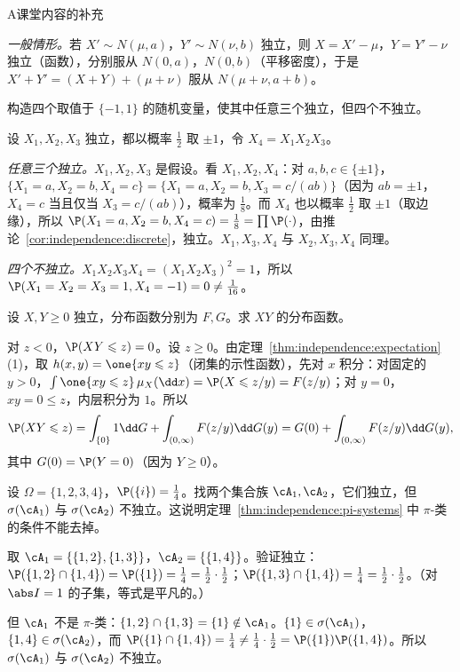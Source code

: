 \begin{exercises}{A}{课堂内容的补充}
\begin{solution}
\emph{一般情形。}若 $X'\sim N(\mu,a)$，$Y'\sim N(\nu,b)$ 独立，则 $X=X'-\mu$，$Y=Y'-\nu$ 独立（函数），分别服从 $N(0,a)$，$N(0,b)$（平移密度），于是 $X'+Y'=(X+Y)+(\mu+\nu)$ 服从 $N(\mu+\nu,a+b)$。
\end{solution}

\item\label{ex:independence:A7} 构造四个取值于 $\{-1,1\}$ 的随机变量，使其中任意三个独立，但四个不独立。
\begin{solution}
设 $X_1,X_2,X_3$ 独立，都以概率 $\frac12$ 取 $\pm1$，令 $X_4=X_1X_2X_3$。

\emph{任意三个独立。}$X_1,X_2,X_3$ 是假设。看 $X_1,X_2,X_4$：对 $a,b,c\in\{\pm1\}$，$\{X_1=a,X_2=b,X_4=c\}=\{X_1=a,X_2=b,X_3=c/(ab)\}$（因为 $ab=\pm1$，$X_4=c$ 当且仅当 $X_3=c/(ab)$），概率为 $\frac18$。而 $X_4$ 也以概率 $\frac12$ 取 $\pm1$（取边缘），所以 $\P(X_1=a,X_2=b,X_4=c)=\frac18=\prod \P(\cdot)$，由推论~\ref{cor:independence:discrete}，独立。$X_1,X_3,X_4$ 与 $X_2,X_3,X_4$ 同理。

\emph{四个不独立。}$X_1X_2X_3X_4=(X_1X_2X_3)^2=1$，所以 $\P(X_1=X_2=X_3=1,X_4=-1)=0\neq\frac1{16}$。
\end{solution}

\item\label{ex:independence:A8} 设 $X,Y\geqslant0$ 独立，分布函数分别为 $F,G$。求 $XY$ 的分布函数。
\begin{solution}
对 $z<0$，$\P(XY\leqslant z)=0$。设 $z\geqslant0$。由定理~\ref{thm:independence:expectation}(1)，取 $h(x,y)=\one\{xy\leqslant z\}$（闭集的示性函数），先对 $x$ 积分：对固定的 $y>0$，$\int\one\{xy\leqslant z\}\,\mu_X(\dd x)=\P(X\leqslant z/y)=F(z/y)$；对 $y=0$，$xy=0\leqslant z$，内层积分为 $1$。所以
\[
\P(XY\leqslant z)=\int_{\{0\}}1\dd G+\int_{(0,\infty)}F(z/y)\dd G(y)=G(0)+\int_{(0,\infty)}F(z/y)\dd G(y),
\]
其中 $G(0)=\P(Y=0)$（因为 $Y\geqslant0$）。
\end{solution}

\item\label{ex:independence:A9} 设 $\Omega=\{1,2,3,4\}$，$\P(\{i\})=\frac14$。找两个集合族 $\cA_1,\cA_2$，它们独立，但 $\sigma(\cA_1)$ 与 $\sigma(\cA_2)$ 不独立。这说明定理~\ref{thm:independence:pi-systems} 中 $\pi$-类的条件不能去掉。
\begin{solution}
取 $\cA_1=\{\{1,2\},\{1,3\}\}$，$\cA_2=\{\{1,4\}\}$。验证独立：$\P(\{1,2\}\cap\{1,4\})=\P(\{1\})=\frac14=\frac12\cdot\frac12$；$\P(\{1,3\}\cap\{1,4\})=\frac14=\frac12\cdot\frac12$。（对 $\abs I=1$ 的子集，等式是平凡的。）

但 $\cA_1$ 不是 $\pi$-类：$\{1,2\}\cap\{1,3\}=\{1\}\notin\cA_1$。$\{1\}\in\sigma(\cA_1)$，$\{1,4\}\in\sigma(\cA_2)$，而 $\P(\{1\}\cap\{1,4\})=\frac14\neq\frac14\cdot\frac12=\P(\{1\})\P(\{1,4\})$。所以 $\sigma(\cA_1)$ 与 $\sigma(\cA_2)$ 不独立。
\end{solution}


\end{exercises}
